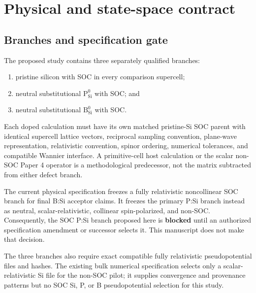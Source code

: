 \documentclass[11pt]{article}
\newenvironment{prospective}{\color{prospectivered}}{}
\begin{document}
\begin{prospective}
\section{Physical and state-space contract}

\subsection{Branches and specification gate}
The proposed study contains three separately qualified branches:
\begin{enumerate}
 \item pristine silicon with SOC in every comparison supercell;
 \item neutral substitutional $\mathrm P_{\mathrm{Si}}^0$ with SOC; and
 \item neutral substitutional $\mathrm B_{\mathrm{Si}}^0$ with SOC.
\end{enumerate}
Each doped calculation must have its own matched pristine-Si SOC parent with identical
supercell lattice vectors, reciprocal sampling convention, plane-wave representation,
relativistic convention, spinor ordering, numerical tolerances, and compatible Wannier
interface. A primitive-cell host calculation or the scalar non-SOC Paper 4 operator is a
methodological predecessor, not the matrix subtracted from either defect branch.

The current physical specification freezes a fully relativistic noncollinear SOC branch
for final B:Si acceptor claims. It freezes the primary P:Si branch instead as neutral,
scalar-relativistic, collinear spin-polarized, and non-SOC. Consequently, the SOC P:Si
branch proposed here is \textbf{blocked} until an authorized specification amendment or
successor selects it. This manuscript does not make that decision.

The three branches also require exact compatible fully relativistic pseudopotential files
and hashes. The existing bulk numerical specification selects only a scalar-relativistic
Si file for the non-SOC pilot; it supplies convergence and provenance patterns but no
SOC Si, P, or B pseudopotential selection for this study.


\end{prospective}
\end{document}
